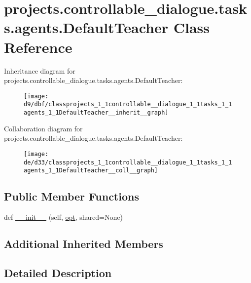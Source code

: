 \hypertarget{classprojects_1_1controllable__dialogue_1_1tasks_1_1agents_1_1DefaultTeacher}{}\section{projects.\+controllable\+\_\+dialogue.\+tasks.\+agents.\+Default\+Teacher Class Reference}
\label{classprojects_1_1controllable__dialogue_1_1tasks_1_1agents_1_1DefaultTeacher}


Inheritance diagram for projects.\+controllable\+\_\+dialogue.\+tasks.\+agents.\+Default\+Teacher\+:
\nopagebreak
\begin{figure}[H]
\begin{center}
\leavevmode
\texttt{[image: d9/dbf/classprojects\_1\_1controllable\_\_dialogue\_1\_1tasks\_1\_1agents\_1\_1DefaultTeacher\_\_inherit\_\_graph]}
\end{center}
\end{figure}


Collaboration diagram for projects.\+controllable\+\_\+dialogue.\+tasks.\+agents.\+Default\+Teacher\+:
\nopagebreak
\begin{figure}[H]
\begin{center}
\leavevmode
\texttt{[image: de/d33/classprojects\_1\_1controllable\_\_dialogue\_1\_1tasks\_1\_1agents\_1\_1DefaultTeacher\_\_coll\_\_graph]}
\end{center}
\end{figure}
\subsection*{Public Member Functions}
\begin{DoxyCompactItemize}
\item 
def \hyperlink{classprojects_1_1controllable__dialogue_1_1tasks_1_1agents_1_1DefaultTeacher_a7e4547b329d721d43fda08c58a5e901c}{\+\_\+\+\_\+init\+\_\+\+\_\+} (self, \hyperlink{classparlai_1_1core_1_1agents_1_1Teacher_a3ce6243860ce978a897922863ed32fa4}{opt}, shared=None)
\end{DoxyCompactItemize}
\subsection*{Additional Inherited Members}


\subsection{Detailed Description}


